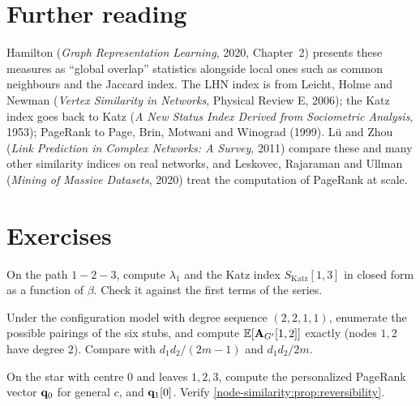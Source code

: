\begin{notechapter}
\section*{Further reading}
Hamilton (\emph{Graph Representation Learning}, 2020, Chapter~2) presents these measures as ``global overlap'' statistics alongside local ones such as common neighbours and the Jaccard index. The LHN index is from Leicht, Holme and Newman (\emph{Vertex Similarity in Networks}, Physical Review E, 2006); the Katz index goes back to Katz (\emph{A New Status Index Derived from Sociometric Analysis}, 1953); PageRank to Page, Brin, Motwani and Winograd (1999). Lü and Zhou (\emph{Link Prediction in Complex Networks: A Survey}, 2011) compare these and many other similarity indices on real networks, and Leskovec, Rajaraman and Ullman (\emph{Mining of Massive Datasets}, 2020) treat the computation of PageRank at scale.

\section*{Exercises}

\begin{exercise}\label{node-similarity:exr:1}
On the path $1 - 2 - 3$, compute $\lambda_1$ and the Katz index $S_{\text{Katz}}[1,3]$ in closed form as a function of $\beta$. Check it against the first terms of the series.
\end{exercise}

\begin{exercise}\label{node-similarity:exr:2}
Under the configuration model with degree sequence $(2, 2, 1, 1)$, enumerate the possible pairings of the six stubs, and compute $\mathbb{E}[\mathbf{A}_{G'}[1,2]]$ exactly (nodes $1, 2$ have degree $2$). Compare with $d_1d_2/(2m-1)$ and $d_1d_2/2m$.
\end{exercise}

\begin{exercise}\label{node-similarity:exr:3}
On the star with centre $0$ and leaves $1, 2, 3$, compute the personalized PageRank vector $\mathbf{q}_0$ for general $c$, and $\mathbf{q}_1[0]$. Verify \cref{node-similarity:prop:reversibility}.
\end{exercise}


\end{notechapter}
